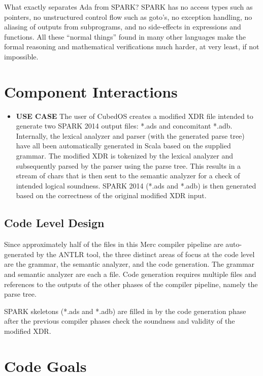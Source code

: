 \begin{itemize}
  What exactly separates Ada from SPARK? SPARK has no access types such as pointers, no
  unstructured control flow such as goto’s, no exception handling, no aliasing of outputs from
  subprograms, and no side-effects in expressions and functions. All these “normal things” found
  in many other languages make the formal reasoning and mathematical verifications much harder,
  at very least, if not impossible.
\end{itemize}

\section{Component Interactions}

\begin{itemize}
\item \textbf{USE CASE} The user of CubedOS creates a modified XDR file intended to generate two
  SPARK 2014 output files: *.ads and concomitant *.adb. Internally, the lexical analyzer and
  parser (with the generated parse tree) have all been automatically generated in Scala based on
  the supplied grammar. The modified XDR is tokenized by the lexical analyzer and subsequently
  parsed by the parser using the parse tree. This results in a stream of chars that is then sent
  to the semantic analyzer for a check of intended logical soundness. SPARK 2014 (*.ads and
  *.adb) is then generated based on the correctness of the original modified XDR input.
\end{itemize}

\subsection{Code Level Design}

Since approximately half of the files in this Merc compiler pipeline are auto-generated by
the ANTLR tool, the three distinct areas of focus at the code level are the grammar, the
semantic analyzer, and the code generation. The grammar and semantic analyzer are each a file.
Code generation requires multiple files and references to the outputs of the other phases of the
compiler pipeline, namely the parse tree.

SPARK skeletons (*.ads and *.adb) are filled in by the code generation phase after the previous
compiler phases check the soundness and validity of the modified XDR.

\section{Code Goals}


